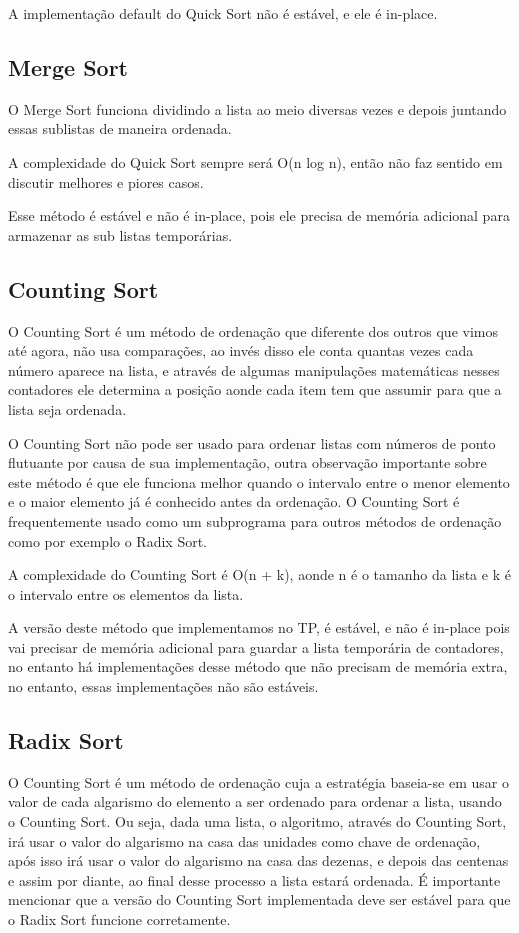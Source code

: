 \documentclass{article}
\begin{document}
	A implementação default do Quick Sort não é estável, e ele é in-place.\\	
	
	\subsection{Merge Sort}
	O Merge Sort funciona dividindo a lista ao meio diversas vezes e depois juntando essas sublistas de maneira ordenada.
	
	A complexidade do Quick Sort sempre será O(n log n), então não faz sentido em discutir melhores e piores casos.
	
	Esse método é estável e não é in-place, pois ele precisa de memória adicional para armazenar as sub listas temporárias.\\
	
	\subsection{Counting Sort}
	O Counting Sort é um método de ordenação que diferente dos outros que vimos até agora, não usa comparações, ao invés disso ele conta quantas vezes cada número aparece na lista, e através de algumas manipulações matemáticas nesses contadores ele determina a posição aonde cada item tem que assumir para que a lista seja ordenada.
	
	O Counting Sort não pode ser usado para ordenar listas com números de ponto flutuante por causa de sua implementação, outra observação importante sobre este método é que ele funciona melhor quando o intervalo entre o menor elemento e o maior elemento já é conhecido antes da ordenação. O Counting Sort é frequentemente usado como um subprograma para outros métodos de ordenação como por exemplo o Radix Sort.
	
	A complexidade do Counting Sort é O(n + k), aonde n é o tamanho da lista e k é o intervalo entre os elementos da lista.
	
	A versão deste método que implementamos no TP, é estável, e não é in-place pois vai precisar de memória adicional para guardar a lista temporária de contadores, no entanto há implementações desse método que não precisam de memória extra, no entanto, essas implementações não são estáveis.\\

	\subsection{Radix Sort}
	O Counting Sort é um método de ordenação cuja a estratégia baseia-se em usar o valor de cada algarismo do elemento a ser ordenado para ordenar a lista, usando o Counting Sort. Ou seja, dada uma lista, o algoritmo, através do Counting Sort, irá usar o valor do algarismo na casa das unidades como chave de ordenação, após isso irá usar o valor do algarismo na casa das dezenas, e depois das centenas e assim por diante, ao final desse processo a lista estará ordenada. É importante mencionar que a versão do Counting Sort implementada deve ser estável para que o Radix Sort funcione corretamente.
	
\end{document}
